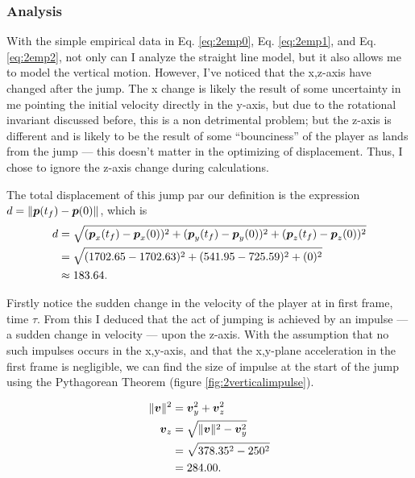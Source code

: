 \subsubsection{Analysis}
With the simple empirical data in Eq. \ref{eq:2emp0}, Eq. \ref{eq:2emp1}, and Eq. \ref{eq:2emp2}, not only can I analyze the straight line model, but it also allows me to model the vertical motion. However, I've noticed that the x,z-axis have changed after the jump. The x change is likely the result of some uncertainty in me pointing the initial velocity directly in the y-axis, but due to the rotational invariant discussed before, this is a non detrimental problem; but the z-axis is different and is likely to be the result of some ``bounciness'' of the player as lands from the jump --- this doesn't matter in the optimizing of displacement. Thus, I chose to ignore the z-axis change during calculations.

The total displacement of this jump par our definition is the expression $d = \|\boldsymbol{p}(t_f) - \boldsymbol{p}(0)\|$, which is
\begin{align*}
    d &= \sqrt{(\boldsymbol{p}_x(t_f) - \boldsymbol{p}_x(0))^2 + (\boldsymbol{p}_y(t_f) - \boldsymbol{p}_y(0))^2 + (\boldsymbol{p}_z(t_f) - \boldsymbol{p}_z(0))^2}\\
    &= \sqrt{(1702.65-1702.63)^2 + (541.95-725.59)^2 + (0)^2}\\
    &\approx 183.64.
\end{align*}

Firstly notice the sudden change in the velocity of the player at in first frame, time $\tau$. From this I deduced that the act of jumping is achieved by an impulse --- a sudden change in velocity --- upon the z-axis. With the assumption that no such impulses occurs in the x,y-axis, and that the x,y-plane acceleration in the first frame is negligible, we can find the size of impulse at the start of the jump using the Pythagorean Theorem (figure \ref{fig:2verticalimpulse}).



\begin{align*}
    \|\boldsymbol{v}\|^2 &= \boldsymbol{v}_y^2 + \boldsymbol{v}_z^2\\
    \boldsymbol{v}_z &= \sqrt{\|\boldsymbol{v}\|^2 - \boldsymbol{v}_y^2}\\
    &= \sqrt{378.35^2 -250^2}\\
    &= 284.00.
\end{align*}

